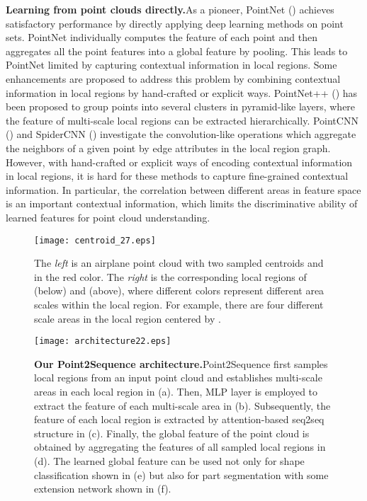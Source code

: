 \documentclass[letterpaper]{article}
\begin{document}
\noindent
\newline
\textbf{Learning from point clouds directly.}\quad  As a pioneer, PointNet (\citealt{qi2017pointnet}) achieves satisfactory performance by directly applying deep learning methods on point sets.
PointNet individually computes the feature of each point and then aggregates all the point features into a global feature by pooling.
This leads to PointNet limited by capturing contextual information in local regions.
Some enhancements are proposed to address this problem by combining contextual information in local regions by hand-crafted or explicit ways.
PointNet++ (\citealt{qi2017pointnet++}) has been proposed to group points into several clusters in pyramid-like layers, where the feature of multi-scale local regions can be extracted hierarchically.
PointCNN (\citealt{li2018pointcnn}) and SpiderCNN (\citealt{xu2018spidercnn}) investigate the convolution-like operations which aggregate the neighbors of a given point by edge attributes in the local region graph.
However, with hand-crafted or explicit ways of encoding contextual information in local regions, it is hard for these methods to capture fine-grained contextual information.
In particular, the correlation between different areas in feature space is an important contextual information, which limits the discriminative ability of learned features for point cloud understanding.
\begin{figure}[tp]
\centering 
\texttt{[image: centroid\_27.eps]}
\caption{The \textit{left} is an airplane point cloud with two sampled centroids  and  in the red color. The \textit{right} is the corresponding local regions of  (below) and  (above), where different colors represent different area scales within the local region. For example, there are four different scale areas  in the local region  centered by .}
\label{fig:multi-scalas}  \end{figure}
\begin{figure*}[tp]
\centering
\texttt{[image: architecture22.eps]}
\caption{\textbf{Our Point2Sequence architecture.}\quad Point2Sequence first samples local regions from an input point cloud and establishes multi-scale areas in each local region in (a). Then, MLP layer is employed to extract the feature of each multi-scale area in (b). Subsequently, the feature of each local region is extracted by attention-based seq2seq structure in (c). Finally, the global feature of the point cloud is obtained by aggregating the features of all sampled local regions in (d). The learned global feature can be used not only for shape classification shown in (e) but also for part segmentation with some extension network shown in (f).
}
\label{fig:network_arichitecture} 
\end{figure*}
\end{document}
